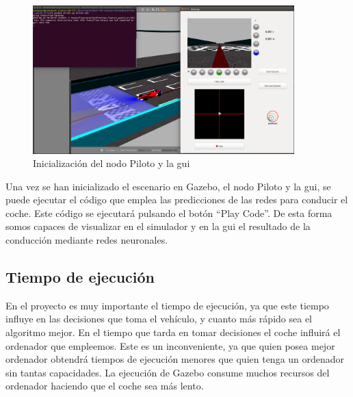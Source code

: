 \begin{figure}[H]
  \begin{center}
    \includegraphics[width=0.9\textwidth]{figures/Infraestructura/driver_node.png}
		\caption{Inicialización del nodo Piloto y la \acrshort{gui}}
		\label{fig.driver_node}
		\end{center}
\end{figure}

Una vez se han inicializado el escenario en Gazebo, el nodo Piloto y la \acrshort{gui}, se puede ejecutar el código que emplea las predicciones de las redes para conducir el coche. Este código se ejecutará pulsando el botón ``Play Code''. De esta forma somos capaces de visualizar en el simulador y en la \acrshort{gui} el resultado de la conducción mediante redes neuronales.\\


\subsection{Tiempo de ejecución}

En el proyecto es muy importante el tiempo de ejecución, ya que este tiempo influye en las decisiones que toma el vehículo, y cuanto más rápido sea el algoritmo mejor. En el tiempo que tarda en tomar decisiones el coche influirá el ordenador que empleemos. Este es un inconveniente, ya que quien posea mejor ordenador obtendrá tiempos de ejecución menores que quien tenga un ordenador sin tantas capacidades. La ejecución de Gazebo consume muchos recursos del ordenador haciendo que el coche sea más lento.\\

